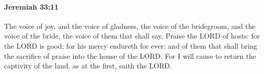 
		\paragraph{Jeremiah 33:11} %
			\label{JEREMIAH-33-11}

			The voice of joy, and the voice of gladness, the voice of the bridegroom, and the voice of the bride, the voice of them that shall say, Praise the LORD of hosts: for the LORD is good; for his mercy endureth for ever: and of them that shall bring the sacrifice of praise into the house of the LORD. For I will cause to return the captivity of the land, as at the first, saith the LORD.


